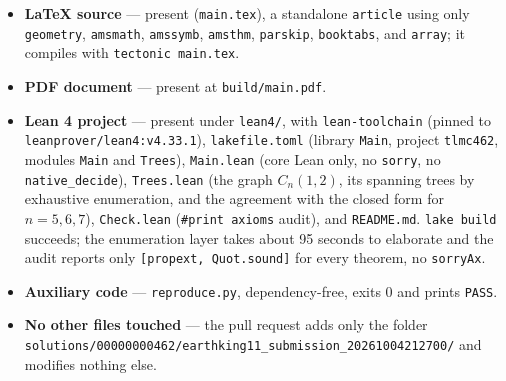 \documentclass[11pt]{article}
\theoremstyle{definition}
\theoremstyle{remark}
\begin{document}
\begin{itemize}
\item \textbf{LaTeX source} --- present (\texttt{main.tex}), a standalone
\texttt{article} using only \texttt{geometry}, \texttt{amsmath},
\texttt{amssymb}, \texttt{amsthm}, \texttt{parskip}, \texttt{booktabs}, and
\texttt{array}; it compiles with \texttt{tectonic main.tex}.
\item \textbf{PDF document} --- present at \texttt{build/main.pdf}.
\item \textbf{Lean 4 project} --- present under \texttt{lean4/}, with
\texttt{lean-toolchain} (pinned to \texttt{leanprover/lean4:v4.33.1}),
\texttt{lakefile.toml} (library \texttt{Main}, project \texttt{tlmc462},
modules \texttt{Main} and \texttt{Trees}), \texttt{Main.lean} (core Lean only,
no \texttt{sorry}, no \texttt{native\_decide}), \texttt{Trees.lean} (the graph
$C_n(1,2)$, its spanning trees by exhaustive enumeration, and the agreement
with the closed form for $n = 5,6,7$), \texttt{Check.lean}
(\texttt{\#print axioms} audit), and \texttt{README.md}. \texttt{lake build}
succeeds; the enumeration layer takes about 95 seconds to elaborate and the
audit reports only \texttt{[propext, Quot.sound]} for every theorem, no
\texttt{sorryAx}.
\item \textbf{Auxiliary code} --- \texttt{reproduce.py}, dependency-free, exits
$0$ and prints \texttt{PASS}.
\item \textbf{No other files touched} --- the pull request adds only the folder
\texttt{solutions/00000000462/}\allowbreak\texttt{earthking11\_submission\_20261004212700/}
and modifies nothing else.
\end{itemize}
\end{document}
